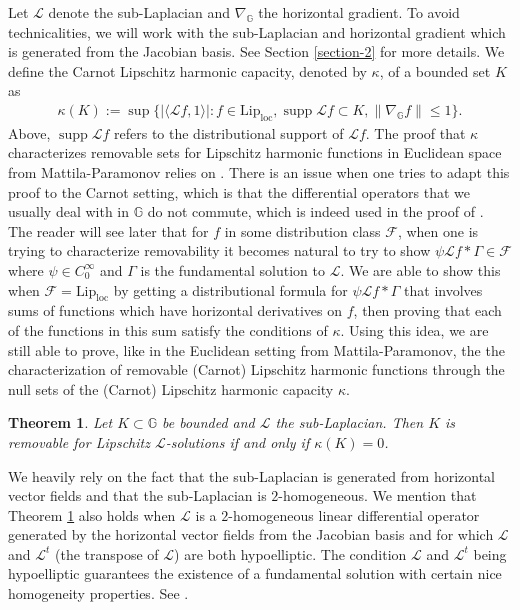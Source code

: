 \documentclass[12pt,a4paper,reqno]{amsart}
\DeclareMathOperator{\supp}{supp}
\newcommand{\cg}{\Gamma}
\renewcommand{\L}{\mathcal{L}}
\newcommand{\F}{\mathcal{F}}
\renewcommand{\k}{\kappa}
\newcommand{\G}{\mathbb{G}}
\numberwithin{equation}{section}
\newtheorem{thm}{Theorem}[section]
\theoremstyle{definition}
\begin{document}
Let $\L$ denote the sub-Laplacian and $\nabla_{\G}$ the horizontal gradient. To avoid technicalities, we will work with the sub-Laplacian and horizontal gradient which is generated from the Jacobian basis. See Section \ref{section-2} for more details. We define the Carnot Lipschitz harmonic capacity, denoted by $\k$, of a bounded set $K$ as \begin{align*}
    \k(K) := \sup \{ |\langle \L f, 1 \rangle| : f \in \text{Lip}_{\text{loc}}, \supp \L f \subset K, \| \nabla_{\G} f\| \leq 1\}. 
\end{align*}
Above, $\supp \L f$ refers to the distributional support of $\L f$. The proof that $\k$ characterizes removable sets for Lipschitz harmonic functions in Euclidean space from Mattila-Paramonov relies on \cite[Lemma 4.2]{P}. There is an issue when one tries to adapt this proof to the Carnot setting, which is that the differential operators that we usually deal with in $\G$ do not commute, which is indeed used in the proof of \cite[Lemma 4.2]{P}. The reader will see later that for $f$ in some distribution class $\F$, when one is trying to characterize removability it becomes natural to try to show $\psi \L f \ast \cg \in \F$ where $\psi \in C_0^{\infty}$ and $\cg$ is the fundamental solution to $\L$. We are able to show this when $\F = \text{Lip}_{\text{loc}}$ by getting a distributional formula for $\psi \L f \ast \cg$ that involves sums of functions which have horizontal derivatives on $f$, then proving that each of the functions in this sum satisfy the conditions of $\k$. Using this idea, we are still able to prove, like in the Euclidean setting from Mattila-Paramonov, the  the characterization of removable (Carnot) Lipschitz harmonic functions through the null sets of the (Carnot) Lipschitz harmonic capacity $\k$. 
\begin{thm}\label{lip-cap-char}
    Let $K \subset \G$ be bounded and $\L$ the sub-Laplacian. Then $K$ is removable for Lipschitz $\L$-solutions if and only if $\k(K) = 0$.
\end{thm}
 We heavily rely on the fact that the sub-Laplacian is generated from horizontal vector fields and that the sub-Laplacian is $2$-homogeneous. We mention that Theorem \ref{lip-cap-char} also holds when $\L$ is a $2$-homogeneous linear differential operator generated by the horizontal vector fields from the Jacobian basis and for which $\L$ and $\L^t$ (the transpose of $\L$) are both hypoelliptic. The condition $\L$ and $\L^t$ being hypoelliptic guarantees the existence of a fundamental solution with certain nice homogeneity properties. See \cite[Theorem 2.1]{Fo}.
 
\end{document}
